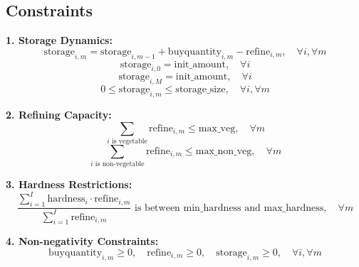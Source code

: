 \documentclass{article}
\begin{document}
\subsection*{Constraints}

\textbf{1. Storage Dynamics:}
\[
\text{storage}_{i,m} = \text{storage}_{i,m-1} + \text{buyquantity}_{i,m} - \text{refine}_{i,m}, \quad \forall i, \forall m
\]
\[
\text{storage}_{i,0} = \text{init\_amount}, \quad \forall i
\]
\[
\text{storage}_{i,M} = \text{init\_amount}, \quad \forall i
\]
\[
0 \leq \text{storage}_{i,m} \leq \text{storage\_size}, \quad \forall i, \forall m
\]

\textbf{2. Refining Capacity:}
\[
\sum_{i \text{ is vegetable}} \text{refine}_{i,m} \leq \text{max\_veg}, \quad \forall m
\]
\[
\sum_{i \text{ is non-vegetable}} \text{refine}_{i,m} \leq \text{max\_non\_veg}, \quad \forall m
\]

\textbf{3. Hardness Restrictions:}
\[
\frac{\sum_{i=1}^{I} \text{hardness}_{i} \cdot \text{refine}_{i,m}}{\sum_{i=1}^{I} \text{refine}_{i,m}} \text{ is between } \text{min\_hardness and max\_hardness}, \quad \forall m
\]

\textbf{4. Non-negativity Constraints:}
\[
\text{buyquantity}_{i,m} \geq 0, \quad \text{refine}_{i,m} \geq 0, \quad \text{storage}_{i,m} \geq 0, \quad \forall i, \forall m
\]
\end{document}
